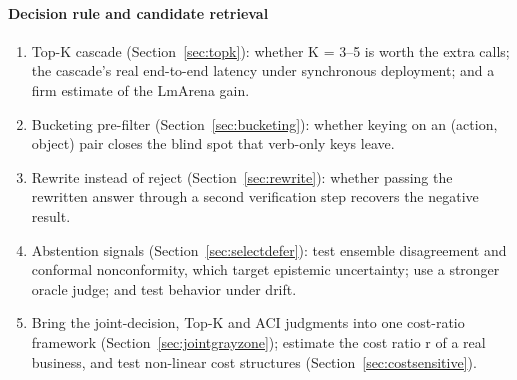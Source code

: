 \documentclass[11pt]{article}
\begin{document}
\paragraph{Decision rule and candidate retrieval}
\begin{enumerate}[leftmargin=*,resume]
  \item Top-K cascade (Section~\ref{sec:topk}): whether K = 3--5 is worth the extra calls; the cascade's real end-to-end latency under synchronous deployment; and a firm estimate of the LmArena gain.
  \item Bucketing pre-filter (Section~\ref{sec:bucketing}): whether keying on an (action, object) pair closes the blind spot that verb-only keys leave.
  \item Rewrite instead of reject (Section~\ref{sec:rewrite}): whether passing the rewritten answer through a second verification step recovers the negative result.
  \item Abstention signals (Section~\ref{sec:selectdefer}): test ensemble disagreement and conformal nonconformity, which target epistemic uncertainty; use a stronger oracle judge; and test behavior under drift.
  \item Bring the joint-decision, Top-K and ACI judgments into one cost-ratio framework (Section~\ref{sec:jointgrayzone}); estimate the cost ratio r of a real business, and test non-linear cost structures (Section~\ref{sec:costsensitive}).
\end{enumerate}
\end{document}
